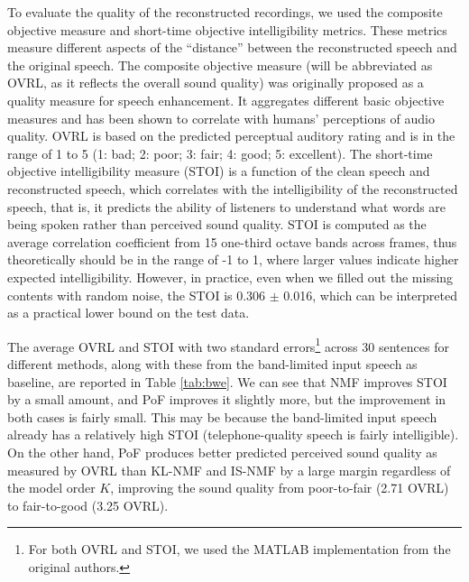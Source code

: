 \documentclass{article} %
\begin{document}
To evaluate the quality of the reconstructed recordings, we used the
composite objective measure \cite{hu2008evaluation} and short-time
objective intelligibility \cite{taal2011algorithm} metrics. These
metrics measure different aspects of the ``distance'' between the
reconstructed speech and the original speech. The composite objective
measure (will be abbreviated as OVRL, as it reflects the overall sound
quality) was originally proposed as a quality measure for speech
enhancement. It aggregates different basic objective measures and has
been shown to correlate with humans' perceptions of audio
quality. OVRL is based on the predicted perceptual auditory rating and
is in the range of 1 to 5 (1: bad; 2: poor; 3: fair; 4: good; 5:
excellent). The short-time objective intelligibility measure (STOI) is
a function of the clean speech and reconstructed speech, which
correlates with the intelligibility of the reconstructed speech, that
is, it predicts the ability of listeners to understand what words are
being spoken rather than perceived sound quality. STOI is computed as
the average correlation coefficient from 15 one-third octave bands
across frames, thus theoretically should be in the range of -1 to 1,
where larger values indicate higher expected intelligibility. However,
in practice, even when we filled out the missing contents with random
noise, the STOI is 0.306 $\pm$ 0.016, which can be interpreted as a practical
lower bound on the test data.

The average OVRL and STOI with two standard errors\footnote{For both
  OVRL and STOI, we used the MATLAB implementation from the original
  authors.}  across 30 sentences for different methods, along with
these from the band-limited input speech as baseline, are reported in
Table \ref{tab:bwe}. We can see that NMF improves STOI by a small amount, and PoF
improves it slightly more, but the improvement in both cases is fairly
small. This may be because the band-limited input speech already has a
relatively high STOI (telephone-quality speech is fairly
intelligible).  On the other hand, PoF produces better
predicted perceived sound quality as measured by OVRL than KL-NMF and
IS-NMF by a large margin regardless of the model order $K$, improving
the sound quality from poor-to-fair (2.71 OVRL) to fair-to-good (3.25 OVRL).
\end{document}
